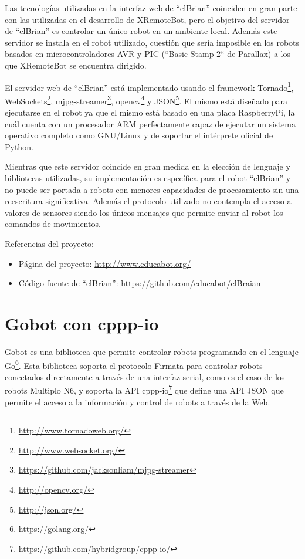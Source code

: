 Las tecnologías utilizadas en la interfaz web de ``elBrian'' coinciden en gran
parte con las utilizadas en el desarrollo de XRemoteBot, pero el objetivo del
servidor de ``elBrian'' es controlar un único robot en un ambiente local.
Además este servidor
se instala en el robot utilizado,  cuestión que sería imposible en los
robots basados en
microcontroladores AVR y PIC (``Basic Stamp 2`` de Parallax)
a los que XRemoteBot se encuentra dirigido.


El servidor web de ``elBrian'' está implementado usando el framework
Tornado\footnote{\url{http://www.tornadoweb.org/}},
WebSockets\footnote{\url{http://www.websocket.org/}},
mjpg-streamer\footnote{\url{https://github.com/jacksonliam/mjpg-streamer}},
opencv\footnote{\url{http://opencv.org/}}
y JSON\footnote{\url{http://json.org/}}.
El mismo está diseñado para ejecutarse
en el robot ya que el mismo está basado en una placa RaspberryPi, la cuál
cuenta con un procesador ARM perfectamente capaz de ejecutar un sistema
operativo completo como GNU/Linux y de soportar el intérprete oficial de Python.

Mientras que este servidor coincide en gran medida en la elección de lenguaje
y bibliotecas utilizadas, su implementación es específica para el robot ``elBrian''
y no puede ser portada a robots con menores capacidades de procesamiento
sin una reescritura significativa. Además el protocolo utilizado no contempla
el acceso a valores de sensores siendo los únicos mensajes que permite enviar
al robot los comandos de movimientos.

Referencias del proyecto:
\begin{itemize}
    \item Página del proyecto: \url{http://www.educabot.org/}
    \item Código fuente de ``elBrian'': \url{https://github.com/educabot/elBraian}
\end{itemize}

\section{Gobot con cppp-io}

Gobot
es una biblioteca que permite controlar robots programando en el lenguaje
Go\footnote{\url{https://golang.org/}}. Esta biblioteca soporta el
protocolo Firmata
para controlar robots
conectados directamente a través de una interfaz serial, como es el caso
de los robots Multiplo N6, y soporta la API
cppp-io\footnote{\url{https://github.com/hybridgroup/cppp-io/}}
que define una API JSON
que permite el acceso a la información y control de robots a través de la Web.

